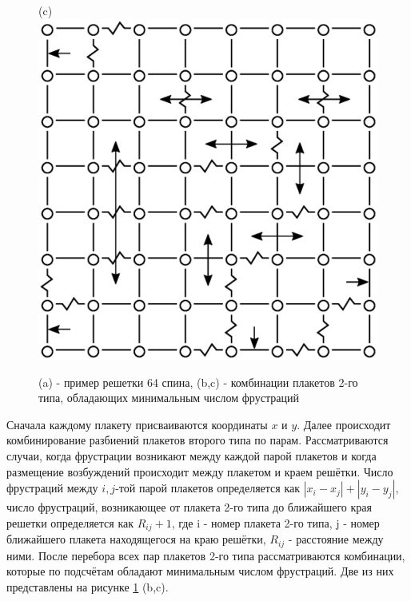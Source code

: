 \documentclass[utf8, babel, sor, jor, amsmath, amssymb, reprint]{elsarticle} %
\begin{document}
\begin{figure}[H]
\begin{minipage}[h]{0.3\linewidth}
	\end{minipage}
	\hspace{10pt}
	\begin{minipage}[h]{0.3\linewidth}
		\centering(c)
		\includegraphics[width=1\linewidth]{pictures/2PS_cell64_J72_5.eps}
	\end{minipage}
	\caption{(a) - пример решетки 64 спина, (b,c) - комбинации плакетов 2-го типа, обладающих минимальным числом фрустраций}
	\label{fig:12PS_cell64_J72_5}
\end{figure}


Сначала каждому плакету присваиваются координаты $x$ и $y$. Далее происходит комбинирование разбиений плакетов второго типа по парам. Рассматриваются случаи, когда фрустрации возникают между каждой парой плакетов и когда размещение возбуждений происходит между плакетом и краем решётки. Число фрустраций между $i,j$-той парой плакетов определяется как $\left|x_i-x_j\right|+\left|y_i-y_j\right|$,  число фрустраций, возникающее от плакета 2-го типа до ближайшего края решетки определяется как $R_{ij}+1$, где i - номер плакета 2-го типа, j - номер ближайшего плакета находящегося на краю решётки, $R_{ij}$ - расстояние между ними. После перебора всех пар плакетов 2-го типа рассматриваются комбинации, которые по подсчётам обладают минимальным числом фрустраций. Две из них представлены на рисунке \ref{fig:12PS_cell64_J72_5} (b,c).
\end{document}

